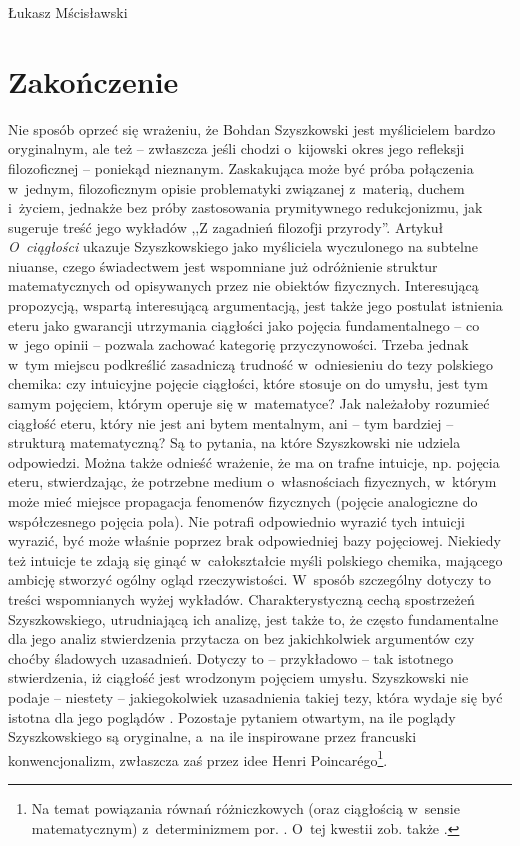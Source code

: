 \begin{artplenv}{Łukasz Mścisławski}
\section{Zakończenie}
Nie sposób oprzeć się wrażeniu, że Bohdan Szyszkowski jest myślicielem bardzo oryginalnym, ale też -- zwłaszcza jeśli chodzi o~kijowski okres jego refleksji filozoficznej -- poniekąd nieznanym. Zaskakująca może być próba połączenia w~jednym, filozoficznym opisie problematyki związanej z~materią, duchem i~życiem, jednakże bez próby zastosowania prymitywnego redukcjonizmu, jak sugeruje treść jego wykładów ,,Z zagadnień filozofji przyrody''. Artykuł \textit{O~ciągłości} ukazuje Szyszkowskiego jako myśliciela wyczulonego na subtelne niuanse, czego świadectwem jest wspomniane już odróżnienie struktur matematycznych od opisywanych przez nie obiektów fizycznych. Interesującą propozycją, wspartą interesującą argumentacją, jest także jego postulat istnienia eteru jako gwarancji utrzymania ciągłości jako pojęcia fundamentalnego -- co w~jego opinii -- pozwala zachować kategorię przyczynowości. Trzeba jednak w~tym miejscu podkreślić zasadniczą trudność w~odniesieniu do tezy polskiego chemika: czy intuicyjne pojęcie ciągłości, które stosuje on do umysłu, jest tym samym pojęciem, którym operuje się w~matematyce? Jak należałoby rozumieć ciągłość eteru, który nie jest ani bytem mentalnym, ani -- tym bardziej -- strukturą matematyczną? Są to pytania, na które Szyszkowski nie udziela odpowiedzi. Można także odnieść wrażenie, że ma on trafne intuicje, np. pojęcia eteru, stwierdzając, że potrzebne medium o~własnościach fizycznych, w~którym może mieć miejsce propagacja fenomenów fizycznych (pojęcie analogiczne do współczesnego pojęcia pola). Nie potrafi odpowiednio wyrazić tych intuicji wyrazić, być może właśnie poprzez brak odpowiedniej bazy pojęciowej. Niekiedy też intuicje te zdają się ginąć w~całokształcie myśli polskiego chemika, mającego ambicję stworzyć ogólny ogląd rzeczywistości. W~sposób szczególny dotyczy to treści wspomnianych wyżej wykładów. Charakterystyczną cechą spostrzeżeń Szyszkowskiego, utrudniającą ich analizę, jest także to, że często fundamentalne dla jego analiz stwierdzenia przytacza on bez jakichkolwiek argumentów czy choćby śladowych uzasadnień. Dotyczy to -- przykładowo -- tak istotnego stwierdzenia, iż ciągłość jest wrodzonym pojęciem umysłu. Szyszkowski nie podaje -- niestety -- jakiegokolwiek uzasadnienia takiej tezy, która wydaje się być istotna dla jego poglądów
\parencite[por.][s.~47]{szyszkowski_o_1916}. %
Pozostaje pytaniem otwartym, na ile poglądy Szyszkowskiego są oryginalne, a~na ile inspirowane przez francuski konwencjonalizm, zwłaszcza zaś przez idee Henri
Poincarégo\footnote{Na temat powiązania równań różniczkowych (oraz ciągłością w~sensie matematycznym) z~determinizmem por. 
\parencites[][s.~98–135]{poincare_nauka_1908}[][s.~98–135, 160–169]{poincare_wartosc_1908}. O~tej kwestii zob. także 
\parencite[][s.~80–81]{leszczynski_wprowadzenie_2003}.}.


\end{artplenv}
